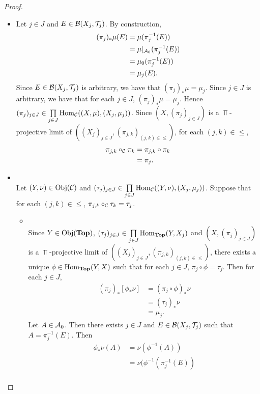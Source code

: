 \documentclass{book}
\begin{document}
\begin{proof}
\begin{enumerate}
\begin{itemize}
			\item Let $j \in J$ and $E \in \mathcal{B}(X_j, \mathcal{T}_j)$. By construction, 
			\begin{align*}
				(\pi_j)_*\mu(E)
				& = \mu(\pi_j^{-1}(E)) \\
				& = \mu|_{\mathcal{A}_0}(\pi_j^{-1}(E)) \\
				& = \mu_0(\pi_j^{-1}(E)) \\
				& = \mu_j(E).
			\end{align*}
			Since $E \in \mathcal{B}(X_j, \mathcal{T}_j)$ is arbitrary, we have that $(\pi_j)_*\mu = \mu_j$. Since $j \in J$ is arbitrary, we have that for each $j \in J$, $(\pi_j)_*\mu = \mu_j$. Hence $(\pi_j)_{j \in J} \in \prod\limits_{j \in J} \operatorname{Hom}_{\mathcal{C}}((X, \mu), (X_j, \mu_j))$. Since $(X, (\pi_j)_{j \in J})$ is a $\Top$-projective limit of $((X_j)_{j \in J}, (\pi_{j,k})_{(j,k) \in {\leq}})$, for each $(j,k) \in {\leq}$, 
			\begin{align*}
				\pi_{j,k} \circ_{\mathcal{C}} \pi_k 
				& = \pi_{j,k} \circ \pi_k \\
				& = \pi_j.
			\end{align*}
			\item {} \\
			Let $(Y, \nu) \in \operatorname{Obj}(\mathcal{C})$ and $(\tau_j)_{j \in J} \in \prod\limits_{j \in J} \operatorname{Hom}_{\mathcal{C}}((Y, \nu),(X_j, \mu_j))$. Suppose that for each $(j,k) \in {\leq}$, $\pi_{j,k} \circ_{\mathcal{C}} \tau_k = \tau_j$. 
			\begin{itemize}
				\item {} \\
				Since $Y \in \operatorname{Obj}(\operatorname*{\text{\textbf{Top}}})$, $(\tau_j)_{j \in J} \in \prod\limits_{j \in J} \operatorname{Hom}_{\operatorname*{\text{\textbf{Top}}}}(Y,X_j)$ and $(X, (\pi_j)_{j \in J})$ is a $\Top$-projective limit of $((X_j)_{j \in J}, (\pi_{j,k})_{(j,k) \in {\leq}})$, there exists a unique $\phi \in \operatorname{Hom}_{\operatorname*{\text{\textbf{Top}}}}(Y, X)$ such that for each $j \in J$, $\pi_j \circ \phi = \tau_j$. Then for each $j \in J$,
				\begin{align*}
					(\pi_j)_*[\phi_*\nu]
					& = (\pi_j \circ \phi)_*\nu \\
					& = (\tau_j)_*\nu \\
					& = \mu_j.  
				\end{align*}
				Let $A \in \mathcal{A}_0$. Then there exists $j \in J$ and $E \in \mathcal{B}(X_j, \mathcal{T}_j)$ such that $A = \pi_{j}^{-1}(E)$. Then
				\begin{align*}
					\phi_*\nu(A)
					& = \nu(\phi^{-1}(A)) \\
					& = \nu(\phi^{-1}(\pi_j^{-1}(E)) \\

\end{align*}
\end{itemize}
\end{itemize}
\end{enumerate}
\end{proof}
\end{document}
